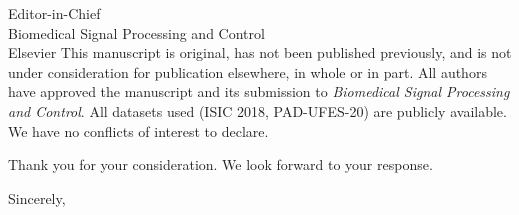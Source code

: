 \documentclass{letter}
\begin{document}
\begin{letter}{Editor-in-Chief\\Biomedical Signal Processing and Control\\Elsevier}
This manuscript is original, has not been published previously, and is not under consideration for publication elsewhere, in whole or in part. All authors have approved the manuscript and its submission to \textit{Biomedical Signal Processing and Control}. All datasets used (ISIC 2018, PAD-UFES-20) are publicly available. We have no conflicts of interest to declare.

Thank you for your consideration. We look forward to your response.

\closing{Sincerely,}

\end{letter}
\end{document}
